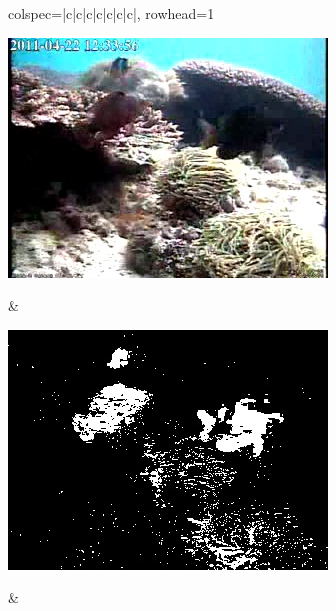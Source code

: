 \begin{longtblr}[
            caption = {Hasil uji coba proses \textit{background subtraction} menggunakan GMM terhadap video indeks gt\textunderscore116},
            label = {tab:gmm_116}
        ]{
            colspec={|c|c|c|c|c|c|c|},
            rowhead=1
        }
\begin{minipage}{0.24\textwidth}
                \includegraphics[width=\linewidth]{image/gt_116/gt_116_original_frame1167.jpg}
            \end{minipage} &
            \begin{minipage}{0.24\textwidth}
                \includegraphics[width=\linewidth]{image/gt_116/gt_116_gmm_frame1167.jpg}
            \end{minipage} &
            \begin{minipage}{0.24\textwidth}

\end{minipage}
\end{longtblr}
